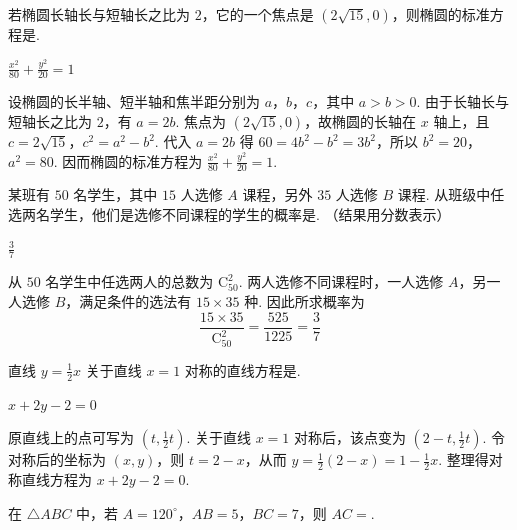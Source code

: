 \begin{problem}
若椭圆长轴长与短轴长之比为 \(2\)，它的一个焦点是 \( (2\sqrt{15},0) \)，则椭圆的标准方程是\fillinblank{}.
\end{problem}

\begin{answer}
\(\frac{x^2}{80}+\frac{y^2}{20}=1\)
\end{answer}

\begin{solution}
设椭圆的长半轴、短半轴和焦半距分别为 \(a\)，\(b\)，\(c\)，其中 \(a>b>0\). 由于长轴长与短轴长之比为 \(2\)，有 \(a=2b\). 焦点为 \((2\sqrt{15},0)\)，故椭圆的长轴在 \(x\) 轴上，且
\(c=2\sqrt{15}\)，\(c^2=a^2-b^2\).
代入 \(a=2b\) 得 \(60=4b^2-b^2=3b^2\)，所以 \(b^2=20\)，\(a^2=80\). 因而椭圆的标准方程为 \(\frac{x^2}{80}+\frac{y^2}{20}=1\).
\end{solution}

\begin{problem}
某班有 \(50\) 名学生，其中 \(15\) 人选修 \(A\) 课程，另外 \(35\) 人选修 \(B\) 课程. 从班级中任选两名学生，他们是选修不同课程的学生的概率是\fillinblank{}. （结果用分数表示）
\end{problem}

\begin{answer}
\(\frac{3}{7}\)
\end{answer}

\begin{solution}
从 \(50\) 名学生中任选两人的总数为 \(\mathrm C_{50}^{2}\). 两人选修不同课程时，一人选修 \(A\)，另一人选修 \(B\)，满足条件的选法有 \(15\times35\) 种. 因此所求概率为
\[
\frac{15\times35}{\mathrm C_{50}^{2}}=\frac{525}{1225}=\frac37
\]
\end{solution}

\begin{problem}
直线 \( y = \frac{1}{2} x \) 关于直线 \( x = 1 \) 对称的直线方程是\fillinblank{}.
\end{problem}

\begin{answer}
\(x+2y-2=0\)
\end{answer}

\begin{solution}
原直线上的点可写为 \((t,\frac12t)\). 关于直线 \(x=1\) 对称后，该点变为 \((2-t,\frac12t)\). 令对称后的坐标为 \((x,y)\)，则 \(t=2-x\)，从而 \(y=\frac12(2-x)=1-\frac12x\). 整理得对称直线方程为 \(x+2y-2=0\).
\end{solution}

\begin{problem}
在 \(\triangle ABC\) 中，若 \(A = 120^{\circ}\)，\(AB = 5\)，\(BC = 7\)，则 \(AC = \)\fillinblank{}.
\end{problem}

